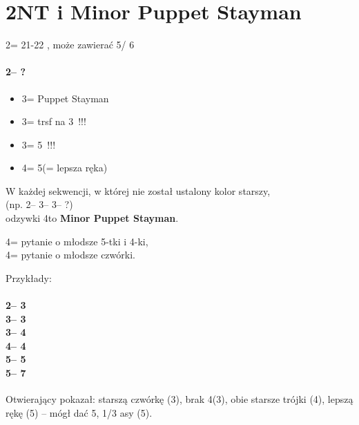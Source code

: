 \documentclass[12pt, a4paper]{report}
\begin{document}
{    \chapter*{\colorbox{Plum!30}{2{\Large{NT}} i Minor Puppet Stayman}}
     {
        2\nt = 21-22 \bal, może zawierać 5\major / 6\minor
        \subsubsection*{2\nt -- ?}
        \begin{itemize}
            \item 3\clubs = Puppet Stayman
            \item 3\spades = trsf na 3\nt\ !!!
            \item 3\nt = 5\hearts\ !!!
            \item 4\clubs = 5\spades (\diams = lepsza ręka)
        \end{itemize}
    }

    \vspace{0.5cm}

    W każdej sekwencji, w której nie został ustalony kolor starszy,\\
    (np. 2\nt -- 3\hearts -- 3\spades -- ?)\\
    odzywki 4\minor to \textbf{Minor Puppet Stayman}.

    4\clubs = pytanie o młodsze 5-tki i 4-ki,\\
    4\diams = pytanie o młodsze czwórki.

    \vspace{0.1cm}

    Przykłady:    
    \subsubsection*{2\nt -- 3\clubs\\
                    3\diams -- 3\hearts\\
                    3\nt -- 4\diams\\
                    4\hearts -- 4\nt\\
                    5\clubs -- 5\hearts\\
                    5\spades -- 7\diams}

    Otwierający pokazał: starszą czwórkę (3\diams), brak 4\spades (3\nt),
    obie starsze trójki (4\hearts), lepszą rękę (5\clubs) -- mógł dać 5\diams,
    1/3 asy (5\spades).

}
\end{document}
